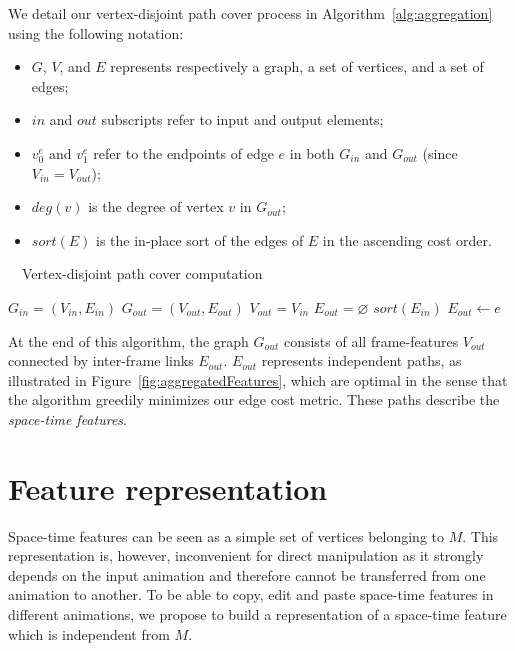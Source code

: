 We detail our vertex-disjoint path cover process in Algorithm~\ref{alg:aggregation} using the following notation:
\begin{itemize}
  \item $G$, $V$, and $E$ represents respectively a graph, a set of vertices, and a set of edges;
  \item $in$ and $out$ subscripts refer to input and output elements;
  \item $v^e_0$ and $v^e_1$ refer to the endpoints of edge $e$ in both $G_{in}$ and $G_{out}$ (since $V_{in} = V_{out}$);
  \item $deg(v)$ is the degree of vertex $v$ in $G_{out}$;
  \item $sort(E)$ is the in-place sort of the edges of $E$ in the ascending cost order.
\end{itemize}

\begin{algorithm}[H]
    \caption[Fluid sculpting: Aggregation]{~~Vertex-disjoint path cover computation} 
\label{alg:aggregation}
\begin{algorithmic}
\State $ G_{in}  = ( V_{in},  E_{in}  ) $ 
\State $ G_{out} = ( V_{out}, E_{out} ) $ 
\State $ V_{out} = V_{in}$ 
\State $ E_{out} = \varnothing $
\State $ sort(E_{in}) $
  	\State $E_{out} \gets e$
  \EndIf
\EndFor
\end{algorithmic}
\end{algorithm} 
At the end of this algorithm, the graph $G_{out}$ consists of all frame-features $V_{out}$ connected by inter-frame links $E_{out}$.
$E_{out}$ represents independent paths, as illustrated in Figure~\ref{fig:aggregatedFeatures}, which are optimal in the sense that the algorithm greedily minimizes our edge cost metric. 
These paths describe the \emph{space-time features}. 

\section{Feature representation}
\label{sec:representation}
Space-time features can be seen as a simple set of vertices belonging to $M$.
This representation is, however, inconvenient for direct manipulation as it strongly depends on the input animation and therefore cannot be transferred from one animation to another. 
To be able to copy, edit and paste space-time features in different animations, we propose to build a representation of a space-time feature which is independent from $M$.

